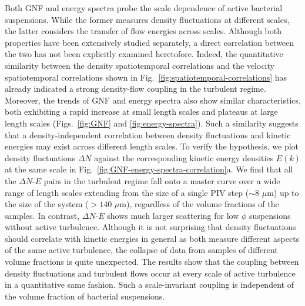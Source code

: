 \documentclass[twocolumn,aps,prx,amsmath,amssymb,longbibliography]{revtex4-2}
\begin{document}
Both GNF and energy spectra probe the scale dependence of active bacterial suspensions. While the former measures density fluctuations at different scales, the latter considers the transfer of flow energies across scales. Although both properties have been extensively studied separately, a direct correlation between the two has not been explicitly examined heretofore. Indeed, the quantitative similarity between the density spatiotemporal correlations and the velocity spatiotemporal correlations shown in Fig.~\ref{fig:spatiotemporal-correlations} has already indicated a strong density-flow coupling in the turbulent regime. Moreover, the trends of GNF and energy spectra also show similar characteristics, both exhibiting a rapid increase at small length scales and plateaus at large length scales (Figs.~\ref{fig:GNF} and \ref{fig:energy-spectra}). Such a similarity suggests that a density-independent correlation between density fluctuations and kinetic energies may exist across different length scales. To verify the hypothesis, we plot density fluctuations $\Delta N$ against the corresponding kinetic energy densities $E(k)$ at the same scale in Fig.~\ref{fig:GNF-energy-spectra-correlation}a. We find that all the $\Delta N$-$E$ pairs in the turbulent regime fall onto a master curve over a wide range of length scales extending from the size of a single PIV step ($\sim 8$ $\mu$m) up to the size of the system ($> 140$ $\mu$m), regardless of the volume fractions of the samples.
In contrast, $\Delta N$-$E$ shows much larger scattering for low $\phi$ suspensions without active turbulence. Although it is not surprising that density fluctuations should correlate with kinetic energies in general as both measure different aspects of the same active turbulence, the collapse of data from samples of different volume fractions is quite unexpected.
The results show that the coupling between density fluctuations and turbulent flows occur at every scale of active turbulence in a quantitative same fashion. Such a scale-invariant coupling is independent of the volume fraction of bacterial suspensions.
\end{document}
